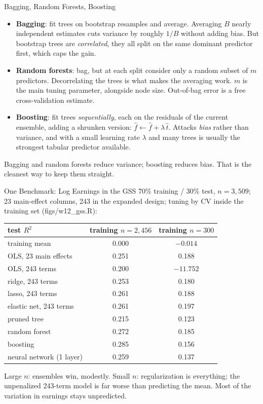 \documentclass[aspectratio=169,11pt,xcolor=dvipsnames]{beamer}
\newcommand{\srcp}[1]{{\scriptsize\color{gray}(#1)}}
\newcommand{\core}{\,\raisebox{0.6pt}{\textcolor{corestar}{$\bigstar$}}}
\begin{document}
\begin{frame}{Bagging, Random Forests, Boosting\core}
\begin{itemize}\itemsep4pt
  \item \textbf{Bagging}: fit trees on bootstrap resamples and average. Averaging
        $B$ nearly independent estimates cuts variance by roughly $1/B$ without
        adding bias. But bootstrap trees are \emph{correlated}, they all split
        on the same dominant predictor first, which caps the gain.
  \item \textbf{Random forests}: bag, but at each split consider only a random
        subset of $m$ predictors. Decorrelating the trees is what makes the
        averaging work. $m$ is the main tuning parameter, alongside node size.
        Out-of-bag error is a free cross-validation estimate.
  \item \textbf{Boosting}: fit trees \emph{sequentially}, each on the residuals of
        the current ensemble, adding a shrunken version:
        $\hat f \leftarrow \hat f + \lambda\,\hat t$. Attacks \emph{bias} rather than
        variance, and with a small learning rate $\lambda$ and many trees is usually the strongest
        tabular predictor available.
\end{itemize}
\vskip3pt
\alert{Bagging and random forests reduce variance; boosting reduces bias.} That
is the cleanest way to keep them straight.
\end{frame}

\begin{frame}{One Benchmark: Log Earnings in the GSS}
70\% training / 30\% test, $n = 3{,}509$; 23 main-effect columns, 243 in the
expanded design; tuning by CV inside the training set \srcp{figs/w12\_gss.R}:
\vskip3pt
\begin{center}\footnotesize
\renewcommand{\arraystretch}{1.0}
\begin{tabular}{@{}lcc@{}}
\toprule
test $R^2$ & training $n = 2{,}456$ & training $n = 300$ \\
\midrule
training mean & 0.000 & $-0.014$ \\
OLS, 23 main effects & 0.251 & 0.188 \\
OLS, 243 terms & 0.200 & \alert{$-11.752$} \\
ridge, 243 terms & 0.253 & 0.180 \\
lasso, 243 terms & 0.261 & 0.188 \\
elastic net, 243 terms & 0.261 & \alert{0.197} \\
pruned tree & 0.215 & 0.123 \\
random forest & 0.272 & 0.185 \\
boosting & \alert{0.285} & 0.156 \\
neural network (1 layer) & 0.259 & 0.137 \\
\bottomrule
\end{tabular}
\end{center}
\vskip2pt
{\footnotesize Large $n$: ensembles win, modestly. Small $n$: regularization is everything; the unpenalized
243-term model is far worse than predicting the mean. Most of the variation in earnings stays unpredicted.}
\end{frame}
\end{document}
